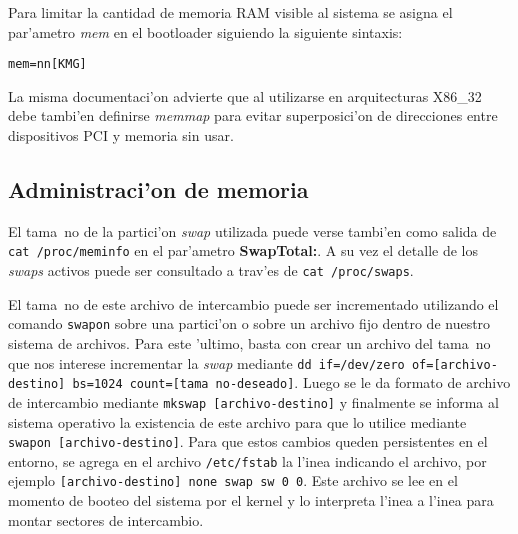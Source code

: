 Para limitar la cantidad de memoria RAM visible al sistema se asigna el par'ametro \emph{mem} en el bootloader siguiendo la siguiente sintaxis:

\texttt{mem=nn[KMG]}

La misma documentaci'on advierte que al utilizarse en arquitecturas X86\_32 debe tambi'en definirse \emph{memmap} para evitar superposici'on de direcciones entre dispositivos PCI y memoria sin usar.

\subsection{Administraci'on de memoria}
El tama~no de la partici'on \emph{swap} utilizada puede verse tambi'en como salida de \texttt{cat /proc/meminfo} en el par'ametro \textbf{SwapTotal:}. A su vez el detalle de los \emph{swaps} activos puede ser consultado a trav'es de \texttt{cat /proc/swaps}.

El tama~no de este archivo de intercambio puede ser incrementado utilizando el comando \texttt{swapon} sobre una partici'on o sobre un archivo fijo dentro de nuestro sistema de archivos. Para este 'ultimo, basta con crear un archivo del tama~no que nos interese incrementar la \emph{swap} mediante \texttt{dd if=/dev/zero of=[archivo-destino] bs=1024 count=[tama~no-deseado]}. Luego se le da formato de archivo de intercambio mediante \texttt{mkswap [archivo-destino]} y finalmente se informa al sistema operativo la existencia de este archivo para que lo utilice mediante \texttt{swapon [archivo-destino]}. Para que estos cambios queden persistentes en el entorno, se agrega en el archivo \texttt{/etc/fstab} la l'inea indicando el archivo, por ejemplo \texttt{[archivo-destino] none swap sw 0 0}. Este archivo se lee en el momento de booteo del sistema por el kernel y lo interpreta l'inea a l'inea para montar sectores de intercambio.
